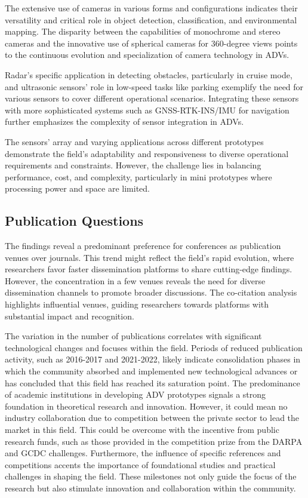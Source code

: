 \documentclass[lettersize,journal]{IEEEtran}
\begin{document}
The extensive use of cameras in various forms and configurations indicates their versatility and critical role in object detection, classification, and environmental mapping. The disparity between the capabilities of monochrome and stereo cameras and the innovative use of spherical cameras for 360-degree views points to the continuous evolution and specialization of camera technology in ADVs.

Radar’s specific application in detecting obstacles, particularly in cruise mode, and ultrasonic sensors’ role in low-speed tasks like parking exemplify the need for various sensors to cover different operational scenarios. Integrating these sensors with more sophisticated systems such as GNSS-RTK-INS/IMU for navigation further emphasizes the complexity of sensor integration in ADVs.

The sensors’ array and varying applications across different prototypes demonstrate the field’s adaptability and responsiveness to diverse operational requirements and constraints. However, the challenge lies in balancing performance, cost, and complexity, particularly in mini prototypes where processing power and space are limited.


\color{black}
\subsection{{\textbf{Publication Questions}}}

The findings reveal a predominant preference for conferences as publication venues over journals. This trend might reflect the field's rapid evolution, where researchers favor faster dissemination platforms to share cutting-edge findings. However, the concentration in a few venues reveals the need for diverse dissemination channels to promote broader discussions. The co-citation analysis highlights influential venues, guiding researchers towards platforms with substantial impact and recognition.

The variation in the number of publications correlates with significant technological changes and focuses within the field. Periods of reduced publication activity, such as 2016-2017 and 2021-2022, likely indicate consolidation phases in which the community absorbed and implemented new technological advances or has concluded that this field has reached its saturation point. The predominance of academic institutions in developing ADV prototypes signals a strong foundation in theoretical research and innovation. However, it could mean no industry collaboration due to competition between the private sector to lead the market in this field. This could be overcome with the incentive from public research funds, such as those provided in the competition prize from the DARPA and GCDC challenges. Furthermore, the influence of specific references and competitions accents the importance of foundational studies and practical challenges in shaping the field. These milestones not only guide the focus of the research but also stimulate innovation and collaboration within the community.
\end{document}
